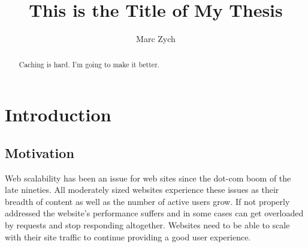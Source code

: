 \documentclass[12pt]{ucthesis}
\begin{document}

\title{This is the Title of My Thesis}
\author{Marc Zych}
  
 
     



\maketitle

\begin{frontmatter}

\copyrightpage

\committeemembershippage

\begin{abstract}

Caching is hard. I'm going to make it better.

\end{abstract}


\tableofcontents


\listoftables

\listoffigures

\end{frontmatter}

\pagestyle{plain}




\renewcommand{\baselinestretch}{1.66}


\chapter{Introduction}
\label{introduction}

\section{Motivation}
Web scalability has been an issue for web sites since the dot-com boom of the late nineties.
All moderately sized websites experience these issues as their breadth of content as well as the number of active users grow.
If not properly addressed the website's performance suffers and in some cases can get overloaded by requests and stop responding altogether.
Websites need to be able to scale with their site traffic to continue providing a good user experience.
\end{document}
